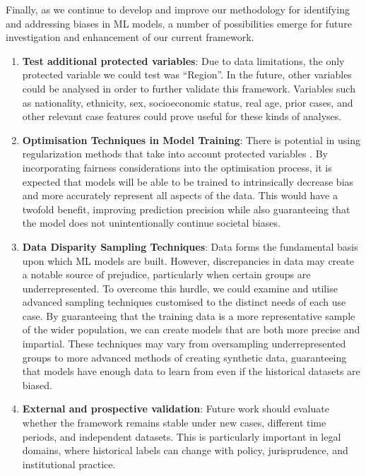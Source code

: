 \documentclass[fleqn,10pt]{wlscirep}
\begin{document}
Finally, as we continue to develop and improve our methodology for identifying and addressing biases in ML models, a number of possibilities emerge for future investigation and enhancement of our current framework.

\begin{enumerate}
    \item \textbf{Test additional protected variables}: Due to data limitations, the only protected variable we could test was ``Region''. In the future, other variables could be analysed in order to further validate this framework. Variables such as nationality, ethnicity, sex, socioeconomic status, real age, prior cases, and other relevant case features could prove useful for these kinds of analyses. 
    \item \textbf{Optimisation Techniques in Model Training}: There is potential in using regularization methods that take into account protected variables \cite{DBLP:journals/corr/abs-1910-11779}. By incorporating fairness considerations into the optimisation process, it is expected that models will be able to be trained to intrinsically decrease bias and more accurately represent all aspects of the data. This would have a twofold benefit, improving prediction precision while also guaranteeing that the model does not unintentionally continue societal biases.

    \item \textbf{Data Disparity Sampling Techniques}: Data forms the fundamental basis upon which ML models are built. However, discrepancies in data may create a notable source of prejudice, particularly when certain groups are underrepresented. To overcome this hurdle, we could examine and utilise advanced sampling techniques customised to the distinct needs of each use case. By guaranteeing that the training data is a more representative sample of the wider population, we can create models that are both more precise and impartial. These techniques may vary from oversampling underrepresented groups to more advanced methods of creating synthetic data, guaranteeing that models have enough data to learn from even if the historical datasets are biased.
    \item \textbf{External and prospective validation}: Future work should evaluate whether the framework remains stable under new cases, different time periods, and independent datasets. This is particularly important in legal domains, where historical labels can change with policy, jurisprudence, and institutional practice.
    
\end{enumerate}
\end{document}
